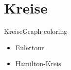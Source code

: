 \section{Kreise}
\begin{frame}{Kreise}{Graph coloring}
	\begin{itemize}
		\item Eulertour
		\item Hamilton-Kreis
	\end{itemize}
\end{frame}
